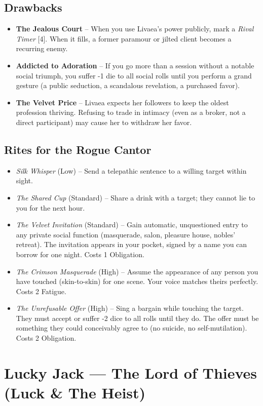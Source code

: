 \documentclass[10pt,twoside]{book}
\begin{document}
\section{Drawbacks}
\begin{itemize}
\item \textbf{The Jealous Court} -- When you use Livaea's power publicly, mark a \textit{Rival Timer } [4]. When it fills, a former paramour or jilted client becomes a recurring enemy.
\item \textbf{Addicted to Adoration} -- If you go more than a session without a notable social triumph, you suffer -1 die to all social rolls until you perform a grand gesture (a public seduction, a scandalous revelation, a purchased favor).
\item \textbf{The Velvet Price} -- Livaea expects her followers to keep the oldest profession thriving. Refusing to trade in intimacy (even as a broker, not a direct participant) may cause her to withdraw her favor.
\end{itemize}

\section{Rites for the Rogue Cantor}
\begin{itemize}
\item \textit{Silk Whisper} (Low) -- Send a telepathic sentence to a willing target within sight.
\item \textit{The Shared Cup} (Standard) -- Share a drink with a target; they cannot lie to you for the next hour.
\item \textit{The Velvet Invitation} (Standard) -- Gain automatic, unquestioned entry to any private social function (masquerade, salon, pleasure house, nobles' retreat). The invitation appears in your pocket, signed by a name you can borrow for one night. Costs 1 Obligation.
\item \textit{The Crimson Masquerade} (High) -- Assume the appearance of any person you have touched (skin-to-skin) for one scene. Your voice matches theirs perfectly. Costs 2 Fatigue.
\item \textit{The Unrefusable Offer} (High) -- Sing a bargain while touching the target. They must accept or suffer -2 dice to all rolls until they do. The offer must be something they could conceivably agree to (no suicide, no self-mutilation). Costs 2 Obligation.
\end{itemize}

\chapter{Lucky Jack --- The Lord of Thieves (Luck \& The Heist)}
\end{document}
